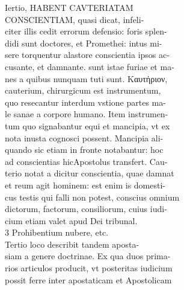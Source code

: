 \documentclass{article}
\begin{document}
\begin{pages}
                Iertio, HABENT CAVTERIATAM \\
                CONSCIENTIAM, quasi dicat, infeli- \\
                citer illis cedit errorum defensio: foris splen- \\
                didi sunt doctores, et Promethei: intus mi- \\
                sere torquentur alastore conscientia ipsos ac- \\
                cusante, et damnante. sunt istae furiae et ma- \\
                nes a quibus nunquam tuti sunt. Καυτήριον, \\
                cauterium, chirurgicum est instrumentum, \\
                quo resecantur interdum vstione partes ma- \\
                le sanae a corpore humano. Item instrumen- \\
                tum quo signabantur equi et mancipia, vt ex \\
                nota inusta cognosci possent. Mancipia ali- \\
                quando sic etiam in fronte notabantur: hoc \\
                ad conscientias hicApostolus transfert. Cau- \\
                terio notat a dicitur conscientia, quae damnat \\
                et reum agit hominem: est enim is domesti- \\
                cus testis qui falli non potest, conscius omnium \\
                dictorum, factorum, consiliorum, cuius iudi- \\
                cium etiam valet apud Dei tribunal. \\
                3 Prohibentium nubere, etc. \\
                Tertio loco describit tandem aposta- \\
                siam a genere doctrinae. Ex qua duos prima- \\
                rios articulos producit, vt posteritas iudicium \\
                possit ferre inter apostaticam et Apostolicam \\

\end{pages}
\end{document}
